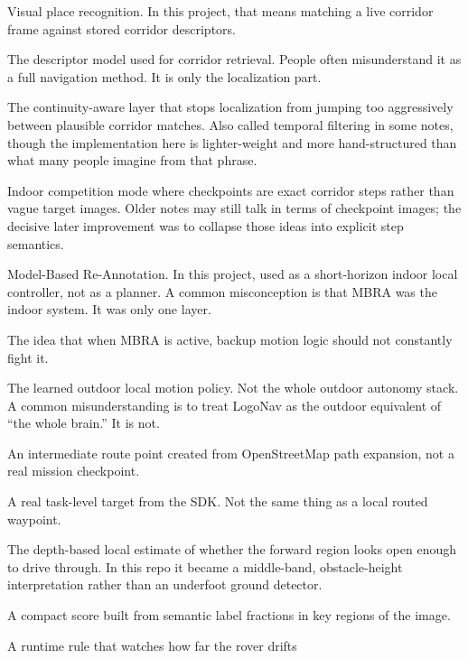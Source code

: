 \documentclass[11pt]{article}
\begin{document}
\begin{description}[style=nextline]
  \item[VPR] Visual place recognition. In this project, that means matching a live
  corridor frame against stored corridor descriptors.
  \item[CosPlace] The descriptor model used for corridor retrieval. People often
  misunderstand it as a full navigation method. It is only the localization part.
  \item[Temporal stabilization] The continuity-aware layer that stops localization
  from jumping too aggressively between plausible corridor matches.
  Also called temporal filtering in some notes, though the implementation here is
  lighter-weight and more hand-structured than what many people imagine from that
  phrase.
  \item[Checkpoint-step mode] Indoor competition mode where checkpoints are exact
  corridor steps rather than vague target images.
  Older notes may still talk in terms of checkpoint images; the decisive later
  improvement was to collapse those ideas into explicit step semantics.
  \item[MBRA] Model-Based Re-Annotation. In this project, used as a short-horizon
  indoor local controller, not as a planner. A common misconception is that MBRA
  was the indoor system. It was only one layer.
  \item[Sole motion authority] The idea that when MBRA is active, backup motion logic
  should not constantly fight it.
  \item[LogoNav] The learned outdoor local motion policy. Not the whole outdoor
  autonomy stack. A common misunderstanding is to treat LogoNav as the outdoor
  equivalent of ``the whole brain.'' It is not.
  \item[OSM-expanded waypoint] An intermediate route point created from
  OpenStreetMap path expansion, not a real mission checkpoint.
  \item[Mission checkpoint] A real task-level target from the SDK. Not the same
  thing as a local routed waypoint.
  \item[Traversability] The depth-based local estimate of whether the forward region
  looks open enough to drive through. In this repo it became a middle-band,
  obstacle-height interpretation rather than an underfoot ground detector.
  \item[Semantic risk] A compact score built from semantic label fractions in key
  regions of the image.
  \item[Route corridor guard] A runtime rule that watches how far the rover drifts

\end{description}
\end{document}
